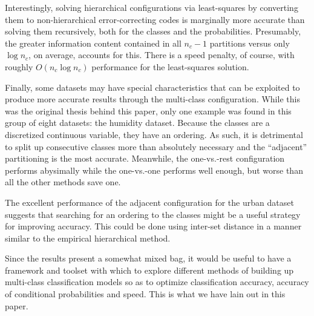 Interestingly, solving hierarchical configurations via least-squares by
converting them to non-hierarchical error-correcting codes is marginally more
accurate than solving them recursively, 
both for the classes and the probabilities.
Presumably, the greater information content contained in all $n_c-1$ partitions
versus only $\log n_c$, on average, accounts for this.
There is a speed penalty, of course, with roughly $O(n_c \log n_c)$ performance 
for the least-squares solution.

Finally, some datasets may have special characteristics that can be exploited
to produce more accurate results through the multi-class configuration.
While this was the original thesis behind this paper,
only one example was found in this group of eight datasets: 
the humidity dataset.
Because the classes are a discretized continuous variable, they have an
ordering. As such, it is detrimental to split up consecutive classes more
than absolutely necessary and the ``adjacent'' partitioning is the most
accurate. Meanwhile, the one-vs.-rest configuration performs abysimally while
the one-vs.-one performs well enough, but worse than all the other methods
save one.

The excellent performance of the adjacent configuration for the urban
dataset suggests that searching for an ordering to the classes might be a
useful strategy for improving accuracy.
This could be done using inter-set distance in a manner similar to the empirical hierarchical method.

Since the results present a somewhat mixed bag, it would be useful to
have a framework and toolset with which to explore different methods of
building up multi-class classification models so as to optimize classification
accuracy, accuracy of conditional probabilities and speed.
This is what we have lain out in this paper.

